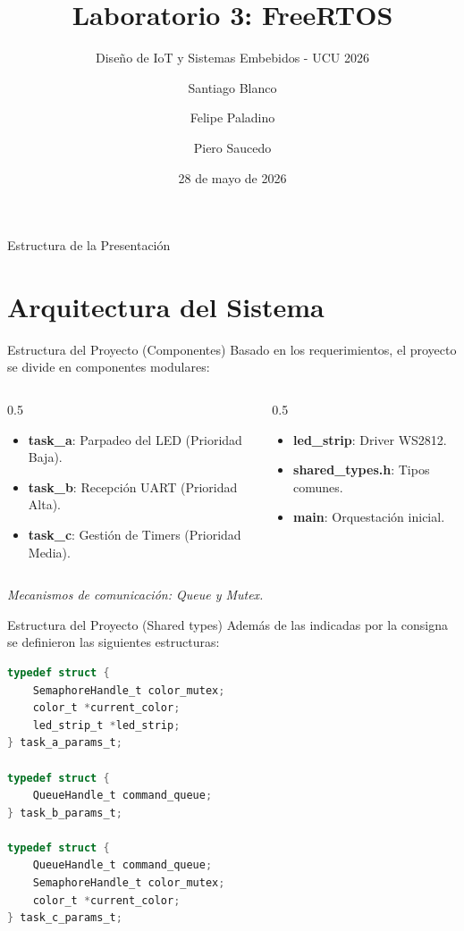 \documentclass[10pt, aspectratio=169]{beamer} %
\title[Lab 3: FreeRTOS]{Laboratorio 3: FreeRTOS}
\subtitle{Diseño de IoT y Sistemas Embebidos - UCU 2026}
\author[Saucedo et al.]{
Santiago Blanco \\
\and Felipe Paladino \\
\and Piero Saucedo
}
\institute[FIT - UCU]{
    Facultad de Ingeniería y Tecnologías\\
    Universidad Católica del Uruguay
}
\date{28 de mayo de 2026}
\begin{document}
\begin{frame}
    \titlepage
\end{frame}

\begin{frame}{Estructura de la Presentación}
    \tableofcontents
\end{frame}

\section{Arquitectura del Sistema}
\begin{frame}{Estructura del Proyecto (Componentes)}
    Basado en los requerimientos, el proyecto se divide en componentes modulares:
    \begin{columns}
        \begin{column}{0.5\textwidth}
            \begin{itemize}
                \item \textbf{task\_a}: Parpadeo del LED (Prioridad Baja).
                \item \textbf{task\_b}: Recepción UART (Prioridad Alta).
                \item \textbf{task\_c}: Gestión de Timers (Prioridad Media).
            \end{itemize}
        \end{column}
        \begin{column}{0.5\textwidth}
            \begin{itemize}
                \item \textbf{led\_strip}: Driver WS2812.
                \item \textbf{shared\_types.h}: Tipos comunes.
                \item \textbf{main}: Orquestación inicial.
            \end{itemize}
        \end{column}
    \end{columns}
    \vfill
    \centering
    \textit{Mecanismos de comunicación: Queue y Mutex.}
\end{frame}

\begin{frame}[fragile]{Estructura del Proyecto (Shared types)}
  Además de las indicadas por la consigna se definieron las siguientes estructuras: 
  \begin{lstlisting}[language=C]
typedef struct {
    SemaphoreHandle_t color_mutex;
    color_t *current_color;
    led_strip_t *led_strip;
} task_a_params_t;

typedef struct {
    QueueHandle_t command_queue;
} task_b_params_t;

typedef struct {
    QueueHandle_t command_queue;
    SemaphoreHandle_t color_mutex;
    color_t *current_color;
} task_c_params_t;

  \end{lstlisting}
  
\end{frame}
\end{document}
